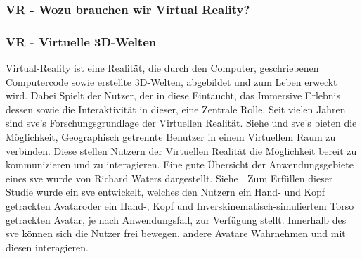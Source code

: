 \documentclass[a4paper,11pt]{article}%
\renewcommand{\\}{\vspace*{0.5\baselineskip} \newline}
\begin{document}
		\subsubsection{VR - Wozu brauchen wir Virtual Reality?}
		\subsubsection{VR - Virtuelle 3D-Welten}
Virtual-Reality ist eine Realität, die durch den Computer, geschriebenen Computercode sowie erstellte 3D-Welten, abgebildet und zum Leben erweckt wird. Dabei Spielt der Nutzer, der in diese Eintaucht, das Immersive Erlebnis dessen sowie die Interaktivität in dieser, eine Zentrale Rolle. \citep[p.6-12]{sherman2018understanding}
	Seit vielen Jahren sind \ac{sve}'s Forschungsgrundlage der Virtuellen Realität. Siehe \citep{shuffler2011there} \citep{steed1999leadership} und \citep{de2011level} \\
	\ac{sve}'s bieten die Möglichkeit, Geographisch getrennte Benutzer in einem Virtuellem Raum zu verbinden. Diese stellen Nutzern der Virtuellen Realität die Möglichkeit bereit zu kommunizieren und zu interagieren. \citep[p. 1-3]{pettifer1999designing} Eine gute Übersicht der Anwendungsgebiete eines \ac{sve} wurde von Richard Waters dargestellt. Siehe \citep{waters1997rise}.
	Zum Erfüllen dieser Studie wurde ein \ac{sve} entwickelt, welches den Nutzern ein \flqq Hand- und Kopf getrackten Avatar\frqq oder ein \flqq Hand-, Kopf und Inverskinematisch-simuliertem Torso getrackten Avatar\frqq, je nach Anwendungsfall, zur Verfügung stellt. Innerhalb des \ac{sve} können sich die Nutzer frei bewegen, andere Avatare Wahrnehmen und mit diesen interagieren.
	
	
\end{document}
